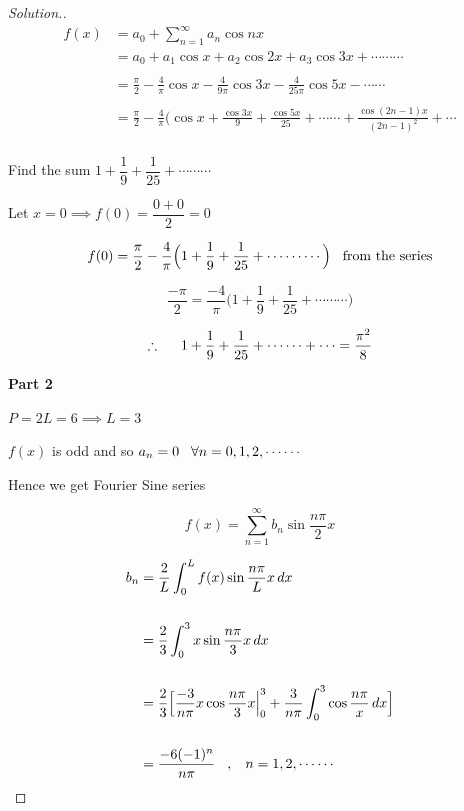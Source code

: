 \documentclass[11pt,a4paper]{article}
\theoremstyle{definition}
\newenvironment{solution}
  {\renewcommand{\qedsymbol}{}\begin{proof}[\textit{Solution}.]}
  {\end{proof}}
\newcommand{\subhead}[1]{%
  \par\medskip\noindent\textbf{#1}\par\nobreak\smallskip}
\begin{document}
\begin{solution}
\begin{align*}
f(x) & = a_0 + \sum^{\infty}_{n=1} a_n \cos nx\\
& = a_0 + a_1\cos x + a_2 \cos 2x + a_3\cos 3x+ \cdots\cdots\cdots\\\\
& = \frac{\pi}{2} - \frac{4}{\pi}\cos x - \frac{4}{9\pi}\cos 3x - \frac{4}{25\pi}\cos 5x - \cdots\cdots\\\\
& = \frac{\pi}{2}-\frac{4}{\pi}\Big(\cos x + \frac{\cos 3x}{9} + \frac{\cos 5x}{25}+ \cdots\cdots + \frac{\cos (2n-1)x}{(2n-1)^2}+\cdots\\
\end{align*}

Find the sum $1 + \dfrac{1}{9}+ \dfrac{1}{25}+ \cdots\cdots\cdots$

Let $x=0 \implies f(0) = \dfrac{0+ 0}{2} = 0$

$$f(0) = \frac{\pi}{2} - \frac{4}{\pi}\Big(1 + \dfrac{1}{9}+ \dfrac{1}{25}+ \cdots\cdots\cdots\Big)\hspace{0.3cm} \text{from the series}$$

$$\frac{-\pi}{2}= \frac{-4}{\pi}\Big(1 + \dfrac{1}{9}+ \dfrac{1}{25}+ \cdots\cdots\cdots\Big)$$

$$\therefore\hspace{0.5cm} 1 + \dfrac{1}{9}+ \dfrac{1}{25}+ \cdots\cdots + \cdots = \frac{\pi^2}{8}$$

\subhead{Part 2}
$P = 2L = 6 \implies L = 3$

$f(x)$ is odd and so $a_n = 0\hspace{0.3cm}\forall n = 0,1,2,\cdots\cdots$

Hence we get Fourier Sine series 

$$f(x) = \sum^{\infty}_{n =1} b_n \sin \frac{n\pi}{2}x$$

\begin{align*}
b_n & = \frac{2}{L}\int^L_0 f(x) \sin \frac{n\pi}{L}x\,dx\\\\
& = \frac{2}{3}\int^3_0x \sin \frac{n\pi}{3}x\,dx\\\\
& = \frac{2}{3}\Big[\frac{-3}{n\pi}x\cos \frac{n\pi}{3}x\Big|^3_0 + \frac{3}{n\pi}\int^3_0 \cos \frac{n\pi}{x}\,dx\Big]\\\\
& = \frac{-6(-1)^n}{n\pi}\hspace{0.3cm},\hspace{0.3cm} n = 1,2,\cdots\cdots\\
\end{align*}


\end{solution}
\end{document}
